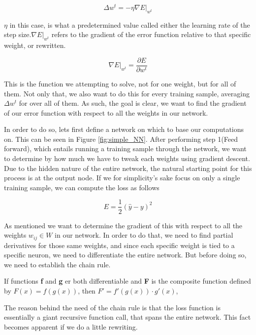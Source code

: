 \begin{equation}
\Delta w^t = -\eta \nabla E|_{w^t}
\end{equation}

$\eta$ in this case, is what a predetermined value called either the learning
rate of the step size.$\nabla E|_{w^t}$ refers to the gradient of the error
function relative to that specific weight, or rewritten.

$$
\nabla E|_{w^t} = \frac{\partial E}{\partial w^t}
$$


This is the function we attempting to solve, not for one weight, but for all
of them. Not only that, we also want to do this for every training sample,
averaging $\Delta w^t$ for over all of them. As such, the goal is clear, we want
to find the gradient of our error function with respect to all the weights in
our network.

In order to do so, lets first define a network on which to base our computations
on. This can be seen in Figure \ref{fig:simple_NN}. After performing step 1(Feed
forward), which entails running a training sample through the network, we want
to determine by how much we have to tweak each weights using gradient descent.
Due to the hidden nature of the entire network, the natural starting point for
this process is at the output node. If we for simplicity's sake focus on only a
single training sample, we can compute the loss as follows

$$
E = \frac{1}{2}(\hat{y} - y)^2
$$

As mentioned we want to determine the gradient of this with respect to all the
weights $w_{ij} \in W$ in our network. In order to do that, we need to find
partial derivatives for those same weights, and since each specific weight is
tied to a specific neuron, we need to differentiate the entire network. But
before doing so, we need to establish the chain rule.

\begin{lemma}
\label{lemma:chainrule}

    If functions \textbf{f} and \textbf{g} er both differentiable and
    \textbf{F} is the composite function defined by $F(x) = f(g(x))$,
    then $F' = f'(g(x)) \cdot g'(x)$,

\end{lemma}

The reason behind the need of the chain rule is that the loss function is
essentially a giant recursive function call, that spans the entire network. This
fact becomes apparent if we do a little rewriting.

